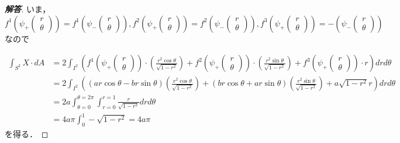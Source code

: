 \documentclass[dvipdfmx,uplatex,nosetpagesize]{jsarticle}
\theoremstyle{definition}
\theoremstyle{StatementsWithStar}
\theoremstyle{StatementsWithStar2}
\theoremstyle{StatementsWithStar3}
\theoremstyle{StatementsWithCCirc}
\theoremstyle{definition}
\begin{document}
\begin{proof}[\bf{解答}]
いま，
\[f^1\left(\psi_+\begin{pmatrix}r\\\theta\end{pmatrix}\right)=f^1\left(\psi_-\begin{pmatrix}r\\\theta\end{pmatrix}\right), f^2\left(\psi_+\begin{pmatrix}r\\\theta\end{pmatrix}\right)=f^2\left(\psi_-\begin{pmatrix}r\\\theta\end{pmatrix}\right), f^3\left(\psi_+\begin{pmatrix}r\\\theta\end{pmatrix}\right)=-\left(\psi_-\begin{pmatrix}r\\\theta\end{pmatrix}\right)\]
なので

\begin{align*}
    \int_{S^2}X\cdot dA &= 2 \int_{I^2} \left(f^1\left(\psi_+\begin{pmatrix}r\\\theta\end{pmatrix}\right)\cdot\left(\frac{r^2\cos\theta}{\sqrt{1-r^2}}\right)+f^2\left(\psi_+\begin{pmatrix}r\\\theta\end{pmatrix}\right)\cdot\left(\frac{r^2\sin\theta}{\sqrt{1-r^2}}\right)+f^3\left(\psi_+\begin{pmatrix}r\\\theta\end{pmatrix}\right)\cdot r \right)drd\theta \\
    &= 2 \int_{I^2} \left( (ar\cos\theta - br\sin\theta)\left(\frac{r^2\cos\theta}{\sqrt{1-r^2}}\right) + (br\cos\theta+ar\sin\theta)\left(\frac{r^2\sin\theta}{\sqrt{1-r^2}}\right) + a\sqrt{1-r^2}r \right)drd\theta \\
    &= 2a\int_{\theta=0}^{\theta=2\pi}\int^{r=1}_{r=0} \frac{r}{\sqrt{1-r^2}}drd\theta \\
    &= 4a\pi\int^1_0 -\sqrt{1-r^2} = 4a\pi
\end{align*}
を得る．
\end{proof}
\end{document}
